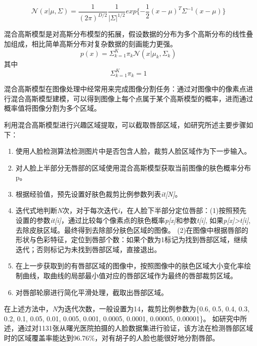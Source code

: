 \begin{equation}
\label{eq:equation1}
    \mathcal{N}(x | \mu, \Sigma) = \frac{1}{(2\pi)^{D/2}}\frac{1}{|\Sigma|^{1/2}}exp\{-\frac{1}{2}(x-\mu)^T\Sigma^{-1}(x-\mu)\}
\end{equation}

混合高斯模型是对高斯分布模型的拓展，假设数据的分布为多个高斯分布的线性叠加组成，相比简单高斯分布对复杂数据的刻画能力更强。
\begin{equation}
\label{eq:equation2}
p(x) = \Sigma^K_{k=1}\pi_k\mathcal{N}(x|\mu_k,\Sigma_k)
\end{equation}
其中
\begin{equation}
\label{eq:equation3}
\Sigma^K_{k=1}\pi_k = 1
\end{equation}

混合高斯模型在图像处理中经常用来完成图像分割任务：通过对图像中的像素点进行混合高斯模型建模，可以得到图像上每个点属于某个高斯模型的概率，进而通过概率值将图像分割为多个区域。


利用混合高斯模型进行兴趣区域提取，可以截取唇部区域，如研究\cite{Hu2016Robust}所述主要步骤如下：
\begin{enumerate}
    \item 使用人脸检测算法检测图片中是否包含人脸，裁剪人脸区域作为下一步输入。

    \item 对人脸上半部分无唇部的区域使用混合高斯模型获取当前图像的肤色概率分布p。

    \item 根据经验值，预先设置好肤色裁剪比例参数列表\textit{it[N]}。

    \item 迭代式地判断\textit{N}次，对于每次迭代\textit{i}，在人脸下半部分定位唇部：(1)按照预先设置的参数\textit{it[i]}，通过比较每个像素点的肤色概率\textit{p[x]}和参数\textit{t[i]}, 如果\textit{p[x]>t[i]}, 去除皮肤区域。最终得到去除部分肤色区域的图像。
(2)在图像中根据唇部的形状与色彩特征，定位到唇部个数：如果个数为1标记为找到唇部区域，继续迭代；否则标记为未找到唇部区域，直接退出。

    \item 在上一步获取到的有唇部区域的图像中，按照图像中的肤色区域大小变化率绘制曲线，取曲线的局部最小值对应的唇部区域作为最终的唇部裁剪区域。

    \item 对唇部轮廓进行简化平滑处理，截取出唇部区域。
\end{enumerate}

在上述方法中，\textit{N}为迭代次数，一般设置为14，裁剪比例参数为\{0.6, 0.5, 0.4, 0.3, 0.2, 0.1, 0.05, 0.01, 0.005, 0.001, 0.0005, 0.0001, 0.00005, 0.00001\}。
如研究\cite{Hu2016Robust}中所述，通过对1131张从曙光医院拍摄的人脸数据集进行验证，该方法在检测唇部区域时的区域覆盖率能达到96.76\%，对有胡子的人脸也能很好地分割唇部。

